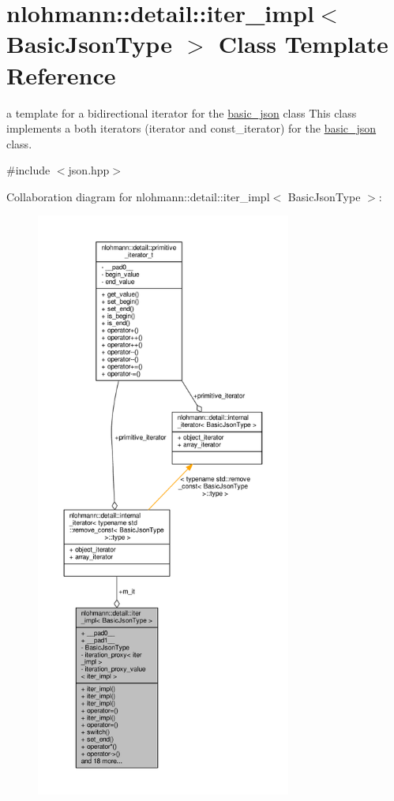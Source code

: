 \hypertarget{classnlohmann_1_1detail_1_1iter__impl}{}\section{nlohmann\+:\+:detail\+:\+:iter\+\_\+impl$<$ Basic\+Json\+Type $>$ Class Template Reference}
\label{classnlohmann_1_1detail_1_1iter__impl}


a template for a bidirectional iterator for the \hyperlink{classnlohmann_1_1basic__json}{basic\+\_\+json} class This class implements a both iterators (iterator and const\+\_\+iterator) for the \hyperlink{classnlohmann_1_1basic__json}{basic\+\_\+json} class.  




{\ttfamily \#include $<$json.\+hpp$>$}



Collaboration diagram for nlohmann\+:\+:detail\+:\+:iter\+\_\+impl$<$ Basic\+Json\+Type $>$\+:
\nopagebreak
\begin{figure}[H]
\begin{center}
\leavevmode
\includegraphics[height=550pt]{classnlohmann_1_1detail_1_1iter__impl__coll__graph}
\end{center}
\end{figure}
